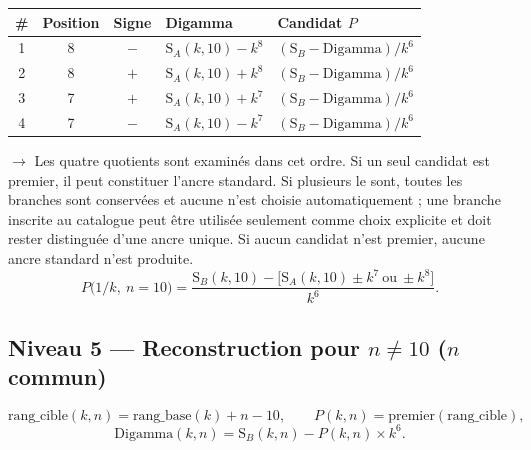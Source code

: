 \documentclass[11pt,a4paper]{article}
\newcommand{\SA}{\mathrm{S}_A}
\newcommand{\SB}{\mathrm{S}_B}
\begin{document}
\begin{center}
\small
\begin{tabular}{@{}c c c l l@{}}
\toprule
\rowcolor{spectralgris}
\# & Position & Signe & Digamma & Candidat $P$ \\
\midrule
1 & 8 & $-$ & $\SA(k,10) - k^{8}$ & $(\SB - \text{Digamma})/k^{6}$ \\
2 & 8 & $+$ & $\SA(k,10) + k^{8}$ & $(\SB - \text{Digamma})/k^{6}$ \\
3 & 7 & $+$ & $\SA(k,10) + k^{7}$ & $(\SB - \text{Digamma})/k^{6}$ \\
4 & 7 & $-$ & $\SA(k,10) - k^{7}$ & $(\SB - \text{Digamma})/k^{6}$ \\
\bottomrule
\end{tabular}
\end{center}

$\to$ Les quatre quotients sont examinés dans cet ordre. Si un seul candidat
est premier, il peut constituer l'ancre standard. Si plusieurs le sont, toutes
les branches sont conservées et aucune n'est choisie automatiquement ; une
branche inscrite au catalogue peut être utilisée seulement comme choix explicite
et doit rester distinguée d'une ancre unique. Si aucun candidat n'est premier,
aucune ancre standard n'est produite.
\[
P\bigl(1/k,\ n=10\bigr) = \frac{\SB(k,10) - \bigl[\SA(k,10) \pm k^{7}\ \text{ou}\ \pm k^{8}\bigr]}{k^{6}}.
\]

\subsection{Niveau 5 --- Reconstruction pour \texorpdfstring{$n \neq 10$}{n != 10} (\texorpdfstring{$n$}{n} commun)}
\vspace{0.3cm}
\begin{boiteformule}
\[
\text{rang\_cible}(k,n) = \text{rang\_base}(k) + n - 10,
\qquad
P(k,n) = \text{premier}(\text{rang\_cible}),
\]
\[
\text{Digamma}(k,n) = \SB(k,n) - P(k,n) \times k^{6}.
\]
\end{boiteformule}
\end{document}
